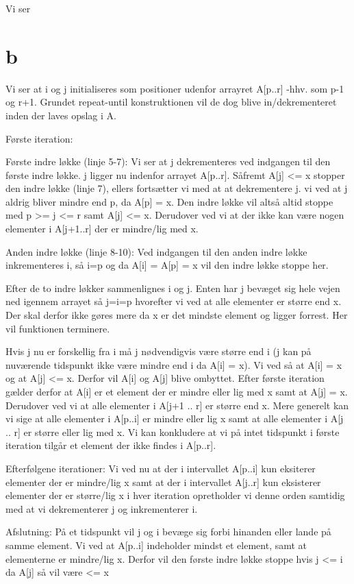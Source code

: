 
Vi ser 

\section{b}
Vi ser at i og j initialiseres som positioner udenfor arrayret A[p..r] -hhv. som p-1 og r+1.
Grundet repeat-until konstruktionen vil de dog blive in/dekrementeret inden der laves opslag i A.

Første iteration:

Første indre løkke (linje 5-7):
Vi ser at j dekrementeres ved indgangen til den første indre løkke. j ligger nu indenfor arrayet A[p..r]. 
Såfremt A[j] <= x stopper den indre løkke (linje 7), ellers fortsætter vi med at at dekrementere j.
vi ved at j aldrig bliver mindre end p, da A[p] = x. Den indre løkke vil altså altid stoppe med p >= j <= r samt A[j] <= x.
Derudover ved vi at der ikke kan være nogen elementer i A[j+1..r] der er mindre/lig med x.
 
Anden indre løkke (linje 8-10):
Ved indgangen til den anden indre løkke inkrementeres i, så i=p og da A[i] = A[p] = x vil den indre løkke stoppe her.

Efter de to indre løkker sammenlignes i og j.
Enten har j bevæget sig hele vejen ned igennem arrayet så j=i=p hvorefter vi ved at alle elementer er større end x. Der skal derfor ikke gøres mere da x er det mindste element og ligger forrest. Her vil funktionen terminere.

Hvis j nu er forskellig fra i må j nødvendigvis være større end i (j kan på nuværende tidspunkt ikke være mindre end i da A[i] = x).
Vi ved så at A[i] = x og at A[j] <= x. Derfor vil A[i] og A[j] blive ombyttet.
Efter første iteration gælder derfor at A[i] er et element der er mindre eller lig med x samt at A[j] = x. Derudover ved vi at alle elementer i A[j+1 .. r] er større end x.
Mere generelt kan vi sige at alle elementer i A[p..i] er mindre eller lig x samt at alle elementer i A[j .. r] er større eller lig med x.
Vi kan konkludere at vi på intet tidspunkt i første iteration tilgår et element der ikke findes i A[p..r].


Efterfølgene iterationer:
Vi ved nu at der i intervallet A[p..i] kun eksiterer elementer der er mindre/lig x samt at der i intervallet A[j..r] kun eksisterer elementer der er større/lig x
i hver iteration opretholder vi denne orden samtidig med at vi dekrementerer j og inkrementerer i.


Afslutning:
På et tidspunkt vil j og i bevæge sig forbi hinanden eller lande på samme element. 
Vi ved at A[p..i] indeholder mindst et element, samt at elementerne er mindre/lig x. Derfor vil den første indre løkke stoppe hvis j <= i da A[j] så vil være <= x

